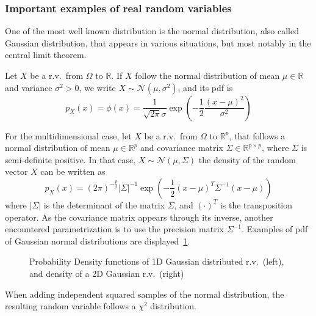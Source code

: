 \documentclass[../../Main_ManuscritThese.tex]{subfiles}
\newcommand\imgpath{/home/victor/acadwriting/Manuscrit/Text/Chapter2/img/}
\begin{document}
\subsubsection{Important examples of real random variables}
One of the most well known distribution is the normal distribution, also called Gaussian distribution, that appears in various situations, but most notably in the central limit theorem.
\begin{example}
  \label{ex:gaussian_distribution}
  Let $X$ be a r.v.\ from $\Omega$ to $\mathbb{R}$.
  If $X$ follow the normal distribution of mean $\mu \in \mathbb{R}$ and variance $\sigma^2>0$, we write $X \sim \mathcal{N}(\mu,\sigma^2)$, and its pdf is
  \begin{equation}
    p_X(x) = \phi(x) = \frac{1}{\sqrt{2\pi}\sigma}\exp\left(-\frac{1}{2}\frac{(x-\mu)^2}{\sigma^2}\right)
  \end{equation}

For the multidimensional case, let $X$ be a r.v.\ from $\Omega$ to $\mathbb{R}^p$, that follows a normal distribution of mean $\mu \in \mathbb{R}^p$ and covariance matrix $\Sigma \in \mathbb{R}^{p\times p}$, where $\Sigma$ is semi-definite positive.
In that case, $X\sim \mathcal{N}(\mu, \Sigma)$ the density of the random vector $X$ can be written as
\begin{equation}
    p_X(x) = (2\pi)^{-\frac{p}{2}}\lvert\Sigma\rvert^{-1}\exp\left(-\frac{1}{2}(x-\mu)^T\Sigma^{-1}(x-\mu)\right)
  \end{equation}
  where $|\Sigma|$ is the determinant of the matrix $\Sigma$, and $(\cdot)^T$ is the transposition operator.
  As the covariance matrix appears through its inverse, another encountered parametrization is to use the precision matrix $\Sigma^{-1}$.
  Examples of pdf of Gaussian normal distributions are displayed~\cref{fig:example_normal}.
\end{example}
\begin{figure}[!h]
  \centering
  
  \caption{Probability Density functions of 1D Gaussian distributed r.v.\ (left), and density of a 2D Gaussian r.v.\ (right)}
  \label{fig:example_normal}
\end{figure}
When adding independent squared samples of the normal distribution, the resulting random variable follows a $\chi^2$ distribution.
\end{document}
